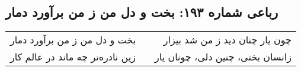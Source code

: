 \begin{center}
\section*{رباعی شماره ۱۹۳: بخت و دل من ز من برآورد دمار}
\label{sec:sh193}
\begin{longtable}{l p{0.5cm} r}
بخت و دل من ز من برآورد دمار
&&
چون یار چنان دید ز من شد بیزار
\\
زین نادره‌تر چه ماند در عالم کار
&&
زانسان بختی، چنین دلی، چونان یار
\\
\end{longtable}
\end{center}
